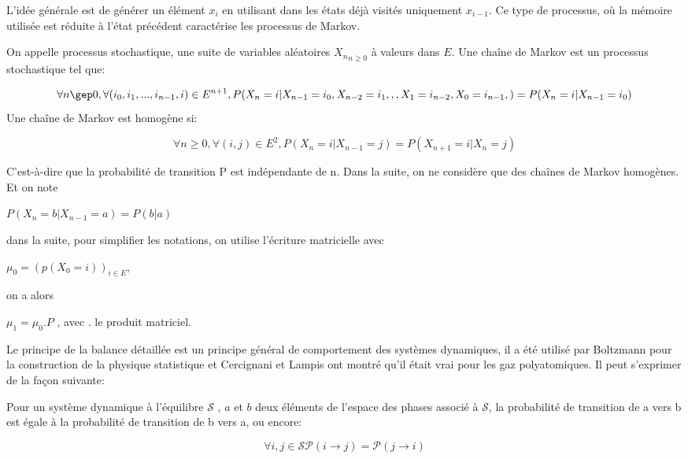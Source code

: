 L'idée générale est de générer un élément $x_i$ en utilisant dans les états déjà visités uniquement $x_{i-1}$. Ce type de processus, où la mémoire utilisée est réduite à l'état précédent caractérise les processus de Markov.


On appelle processus stochastique, une suite de variables aléatoires ${X_n}_{n\geq 0}$ à valeurs dans $E$.
Une chaîne de Markov est un processus stochastique tel que:

\begin{equation}
  \forall n \gep 0 , \forall (i_0,i_1,...,i_{n-1},i) \in E^{n+1},
  
  P(X_n=i|X_{n-1}=i_0,X_{n-2}=i_1,,,X_{1}=i_{n-2},X_{0}=i_{n-1},) = P(X_n=i|X_{n-1}=i_0) 
\end{equation}
Une chaîne de Markov est homogène si:

\begin{equation}
  \label{eq_homog}
  \forall n \geq 0 , \forall (i,j) \in E^2,
  
  P(X_n=i|X_{n-1}=j)= P(X_{n+1}=i|X_n=j) 
\end{equation}

C'est-à-dire que la probabilité de transition P est indépendante de n. Dans la suite, on ne considère que des chaînes de Markov homogènes. Et on note

$P(X_n=b | X_{n-1}=a) = P(b|a)$


dans la suite, pour simplifier les notations, on utilise l'écriture matricielle avec

$\mu_0 =(p(X_0=i))_{i \in E},$

on a alors

$\mu_1 =\mu_0 . P$   , avec . le produit matriciel.


Le principe de la balance détaillée est un principe général de comportement des systèmes dynamiques, il a été utilisé par Boltzmann pour la construction de la physique statistique et Cercignani et Lampis ont montré qu'il était vrai pour les gaz polyatomiques. Il peut s'exprimer de la façon suivante:

Pour un système dynamique à l'équilibre $\mathcal{S}$ , $a$ et $b$ deux éléments de l'espace des phases associé à $\mathcal{S}$, la probabilité de transition de a vers b est égale à la probabilité de transition de b vers a, ou encore: 

\begin{equation}
  \forall i,j \in \mathcal{S}
  
\mathcal{P}(i \rightarrow j) = \mathcal{P}(j \rightarrow i) 
\end{equation}

